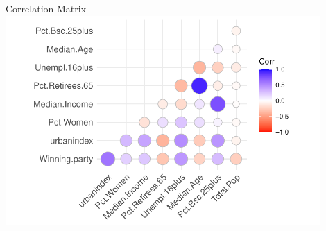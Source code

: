 \documentclass{beamer}
\begin{document}
\begin{frame}{Correlation Matrix}
    \includegraphics[width=0.9\textwidth]{plots/corrplot.pdf}
\end{frame}










\end{document}
